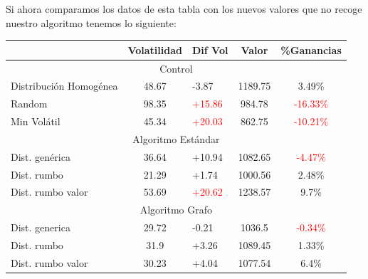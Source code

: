 \documentclass[12pt,a4paper]{article}
\begin{document}
		Si ahora comparamos los datos de esta tabla con los nuevos valores que no recoge nuestro algoritmo tenemos lo siguiente:\\

\begin{table}[H]
\centering
\begin{tabular}{l|c|l|c|c|}
                                                     & Volatilidad                         & Dif Vol                             & Valor   & \%Ganancias                \\ 
\hline
\multicolumn{5}{c}{{\cellcolor[rgb]{0.796,0.808,0.984}}Control}                                                                                                         \\ 
\hline
\rowcolor[rgb]{0.925,0.957,1} Distribución Homogénea & 48.67                               & \textcolor[rgb]{0,0.6,0.004}{-3.87} & 1189.75 & 3.49\%                     \\
\rowcolor[rgb]{0.855,0.91,0.988} Random              & 98.35                               & \textcolor{red}{+15.86}             & 984.78  & \textcolor{red}{-16.33\%}  \\
\rowcolor[rgb]{0.925,0.957,1} Min Volátil            & 45.34                               & \textcolor{red}{+20.03}             & 862.75  & \textcolor{red}{-10.21\%}  \\ 
\hline
\multicolumn{5}{c}{{\cellcolor[rgb]{0.796,0.808,0.984}}Algoritmo Estándar}                                                                                              \\ 
\hline
\rowcolor[rgb]{0.925,0.957,1} Dist. genérica         & 36.64                               & +10.94                              & 1082.65 & \textcolor{red}{-4.47\%}   \\
\rowcolor[rgb]{0.855,0.91,0.988} Dist. rumbo         & \textcolor[rgb]{0,0.6,0.004}{21.29} & \textcolor[rgb]{0,0.6,0.004}{+1.74} & 1000.56 & 2.48\%                     \\
\rowcolor[rgb]{0.925,0.957,1} Dist. rumbo valor      & 53.69                               & \textcolor{red}{+20.62}             & 1238.57 & 9.7\%                      \\ 
\hline
\multicolumn{5}{c}{{\cellcolor[rgb]{0.796,0.808,0.984}}Algoritmo Grafo}                                                                                                 \\ 
\hline
\rowcolor[rgb]{0.925,0.957,1} Dist. generica         & \textcolor[rgb]{0,0.6,0.004}{29.72} & \textcolor[rgb]{0,0.6,0.004}{-0.21} & 1036.5  & \textcolor{red}{-0.34\%}   \\
\rowcolor[rgb]{0.855,0.91,0.988} Dist. rumbo         & 31.9                                & +3.26                               & 1089.45 & 1.33\%                     \\
\rowcolor[rgb]{0.925,0.957,1} Dist. rumbo valor      & \textcolor[rgb]{0,0.6,0.004}{30.23} & +4.04                               & 1077.54 & 6.4\%                     
\end{tabular}
\end{table}
\end{document}
